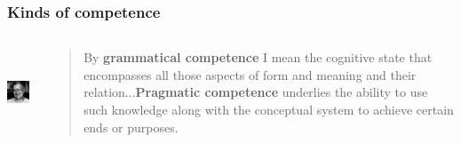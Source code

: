 \documentclass[compress]{beamer}
\begin{document}
\begin{frame}
\frametitle{Kinds of competence}
\begin{columns}[T]  
   \begin{column}{.2\textwidth}
	  \vspace{20pt}
	  \includegraphics[height=1in]{chomsky.jpg}   
   \end{column}
   \begin{column}{.75\textwidth}
      \begin{block}{}
      \begin{quote}
	   By \textbf{grammatical competence} I  mean the cognitive state that encompasses all those aspects of form and meaning and their relation...\textbf{Pragmatic competence} underlies the ability to use such knowledge along with the conceptual system to achieve certain ends or purposes. 
      \end{quote}           
      \end{block}
    \end{column}
  \end{columns}
  \vfill \hfill \citep{chomsky1980rules}
\end{frame}
\end{document}
